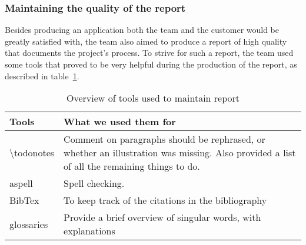 \subsubsection{Maintaining the quality of the report}
Besides producing an application both the team and the customer would be greatly satisfied with, the team also aimed to produce a report of high quality that documents the project's process. To strive for such a report, the team used some tools that proved to be very helpful during the production of the report, as described in table~\ref{tab:reportTools}.

\begin{table}[H]
\begin{tabular}{|l|p{13cm}|}
\hline
\textbf{Tools} & \textbf{What we used them for}\\\hline
\textbackslash todonotes&Comment on paragraphs should be rephrased, or whether an illustration was missing. Also provided a list of all the remaining things to do.\\\hline
aspell & Spell checking.\\\hline
BibTex&To keep track of the citations in the bibliography\\\hline
glossaries& Provide a brief overview of singular words, with explanations\\\hline
\end{tabular}
\caption{Overview of tools used to maintain report}
\label{tab:reportTools}
\end{table}

\begin{comment}
\noindent\textbf{\textbackslash todonotes}\\
Feedback is key when creating a product. The \textbackslash todonotes~\cite{todo} package allowed the team to comment on paragraphs and formulations we wanted to rephrase, whether an illustration was missing, and also gave us a list of all the things we had to do, making it easy to get an overview of the remaining tasks regarding the report.\\

\noindent\textbf{Spell checking: aspell}\\
Although manual proofreading cannot be avoided, it is advantageous to have a tool to perform automatic spell checking. Aspell~\cite{aspell} is such a tool.\\

\noindent\textbf{References and glossary}\\
To keep track of the citations in the bibliography in the report, we used a LaTeX-package called BibTex~\cite{bibtex}, and for our glossaries, a package called glossaries~\cite{glossaries}.

\end{comment}
